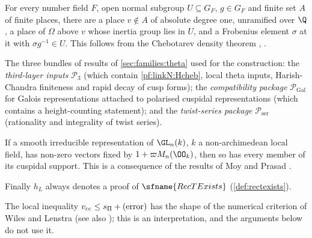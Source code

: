 \begin{hypothesis}[Chebotarev]\label{pf:linkN:Hcheb}
For every number field $F$, open normal subgroup $U\subseteq G_F$, $g\in G_F$ and finite set $A$ of finite places, there
are a place $v\notin A$ of absolute degree one, unramified over $\Q$, a place of $\Omega$ above $v$ whose inertia group
lies in $U$, and a Frobenius element $\sigma$ at it with $\sigma g^{-1}\in U$. This follows from the Chebotarev density
theorem \cite{Chebotarev1926}, \cite[Ch.~VII, \S13]{Neukirch1999}.
\end{hypothesis}

\begin{hypothesis}\label{pf:linkN:Hlayer}
The three bundles of results of \cref{sec:families:theta} used for the construction: the \emph{third-layer inputs}
$\mathcal P_3$ (which contain \cref{pf:linkN:Hcheb}, local theta inputs, Harish-Chandra finiteness and rapid decay of cusp
forms); the \emph{compatibility package} $\mathcal P_{\mathrm{Gal}}$ for Galois representations attached to polarised
cuspidal representations (which contains a height-counting statement); and the \emph{twist-series package}
$\mathcal P_{\mathrm{ser}}$ (rationality and integrality of twist series).
\end{hypothesis}

\begin{hypothesis}\label{pf:linkN:Hdz}
If a smooth irreducible representation of $\GL_n(k)$, $k$ a non-archimedean local field, has non-zero vectors fixed by
$1+\varpi M_n(\OO_k)$, then so has every member of its cuspidal support. This is a consequence of the results of Moy and
Prasad \cite{MoyPrasad1994,MoyPrasad1996}.
\end{hypothesis}

Finally $h_L$ always denotes a proof of $\sfname{RecTExists}$ (\cref{def:rectexists}).

\begin{remark}\label{pf:linkN:interp}
The local inequality $v_{\mathrm{cc}}\le s_\Pi+(\text{error})$ has the shape of the numerical criterion of Wiles and Lenstra
\cite{Wiles1995,Lenstra1995} (see also \cite{TaylorWiles1995,DarmonDiamondTaylor1997}); this is an interpretation, and
the arguments below do not use it.
\end{remark}

